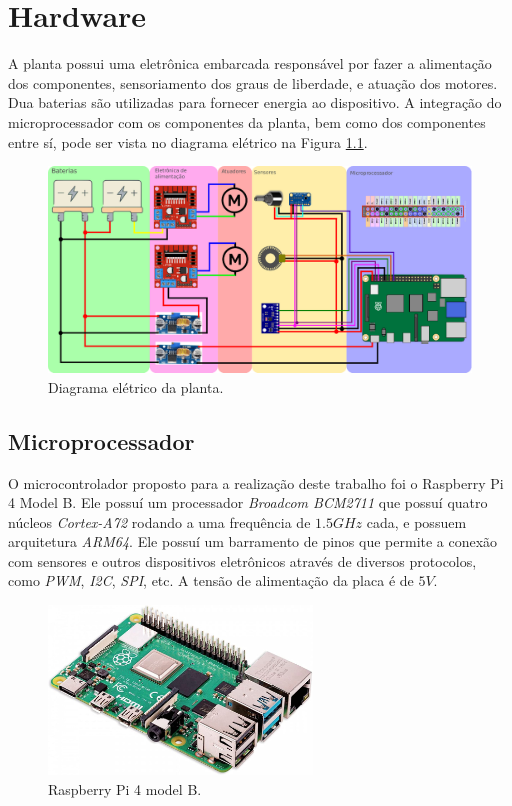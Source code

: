 \chapter{Hardware}%
    \label{chp:Hardware}
	
	A planta possui uma eletrônica embarcada responsável por fazer a alimentação dos componentes, sensoriamento dos graus de liberdade, e atuação dos motores. Dua baterias são utilizadas para fornecer energia ao dispositivo. A integração do microprocessador com os componentes da planta, bem como dos componentes entre sí, pode ser vista no diagrama elétrico na Figura \ref{img:diagrama}.
	
	\begin{figure}[h]
        \centering
        \includegraphics[width=\columnwidth]{Imagens/cap2/montagem3.eps}
        \caption{Diagrama elétrico da planta.}
        \label{img:diagrama}
    \end{figure}
    
    \section{Microprocessador}
	    
	    O microcontrolador proposto para a realização deste trabalho foi o Raspberry Pi 4 Model B. Ele possuí um processador \textit{Broadcom BCM2711} que possuí quatro núcleos \textit{Cortex-A72} rodando a uma frequência de $1.5 GHz$ cada, e possuem arquitetura \textit{ARM64}. Ele possuí um barramento de pinos que permite a conexão com sensores e outros dispositivos eletrônicos através de diversos protocolos, como \textit{PWM}, \textit{I2C}, \textit{SPI}, etc. A tensão de alimentação da placa é de $5V$.
	
    	\begin{figure}[h]
            \centering
            \includegraphics[width=7cm]{Imagens/cap2/rasp2.jpg}
            \caption{Raspberry Pi 4 model B.}
            \label{img:theta}
        \end{figure}
	
